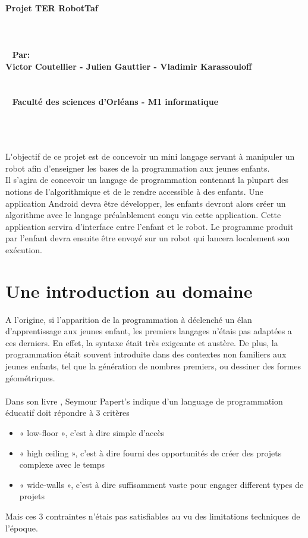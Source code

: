 \documentclass[a4paper]{article}
\begin{document}
\begin{center}
{\Huge \textbf{Projet TER RobotTaf}}
\\~
\\~
\\~
\\~
{\Large \textbf{Par:}}\\
\large{\textbf{Victor Coutellier - Julien Gauttier - Vladimir Karassouloff}}
\\~
\\~
\\~
\large{\textbf{Faculté des sciences d’Orléans -  M1 informatique}}
\\~
\\~
\\~
\end{center}

\tableofcontents
\newpage

\lettrine{L}'objectif de ce projet est de concevoir un mini langage servant à manipuler un robot afin d’enseigner les bases de la programmation aux jeunes enfants.
\\
Il s’agira de concevoir un langage de programmation contenant la plupart des notions de l’algorithmique et de le rendre accessible à des enfants. Une application Android devra être développer, les enfants devront alors créer un algorithme avec le langage préalablement conçu via cette application. Cette application servira d’interface entre l’enfant et le robot. Le programme produit par l’enfant devra ensuite être envoyé sur un robot qui lancera localement son exécution.

\section{Une introduction au domaine}

A l’origine, si l’apparition de la programmation à déclenché un élan d’apprentissage aux jeunes enfant, les premiers langages n’étais pas adaptées a ces derniers. En effet, la syntaxe était très exigeante et austère. De plus, la programmation était souvent introduite dans des contextes non familiers aux jeunes enfants, tel que la génération de nombres premiers, ou dessiner des formes géométriques.

\paragraph{}
Dans son livre \cite{Papert:1980:MCC:1095592}, Seymour Papert’s indique d’un language de programmation éducatif doit répondre à 3 critères
\begin{itemize}
\item « low-floor », c’est à dire simple d’accès
\item « high ceiling », c’est à dire fourni des opportunités de créer des projets complexe avec le temps
\item « wide-walls », c’est à dire suffisamment vaste pour engager different types de projets 
\end{itemize}
Mais ces 3 contraintes n’étais pas satisfiables au vu des limitations techniques de l’époque.
\end{document}
